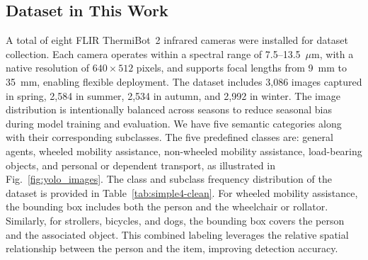 \documentclass[journal,twoside,web]{ieeecolor}
\begin{document}
\subsection{Dataset in This Work}
A total of eight FLIR ThermiBot~2 infrared cameras were installed for dataset collection. Each camera operates within a spectral range of 7.5--13.5~$\mu$m, with a native resolution of $640 \times 512$ pixels, and supports focal lengths from 9~mm to 35~mm, enabling flexible deployment. The dataset includes 3{,}086 images captured in spring, 2{,}584 in summer, 2{,}534 in autumn, and 2{,}992 in winter. The image distribution is intentionally balanced across seasons to reduce seasonal bias during model training and evaluation. We have five semantic categories along with their corresponding subclasses. The five predefined classes are: general agents, wheeled mobility assistance, non-wheeled mobility assistance, load-bearing objects, and personal or dependent transport, as illustrated in Fig.~\ref{fig:yolo_images}. The class and subclass frequency distribution of the dataset is provided in Table~\ref{tab:simple4-clean}. For wheeled mobility assistance, the bounding box includes both the person and the wheelchair or rollator. Similarly, for strollers, bicycles, and dogs, the bounding box covers the person and the associated object. This combined labeling leverages the relative spatial relationship between the person and the item, improving detection accuracy.
\end{document}
